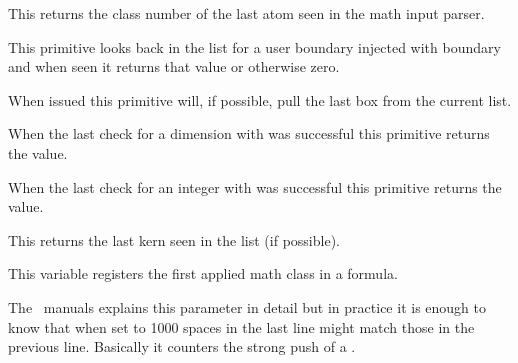 {\getbuffer}

\stopnewprimitive

\startnewprimitive[title={\prm {lastatomclass}}]

This returns the class number of the last atom seen in the math input parser.

\stopnewprimitive

\startnewprimitive[title={\prm {lastboundary}}]

This primitive looks back in the list for a user boundary injected with \prm
{boundary} and when seen it returns that value or otherwise zero.

\stopnewprimitive

\startoldprimitive[title={\prm {lastbox}}]

When issued this primitive will, if possible, pull the last box from the current
list.

\stopoldprimitive

\startnewprimitive[title={\prm {lastchkdimension}}]

When the last check for a dimension with  was successful
this primitive returns the value.

\stopnewprimitive

\startnewprimitive[title={\prm {lastchknumber}}]

When the last check for an integer with  was successful this
primitive returns the value.

\stopnewprimitive

\startoldprimitive[title={\prm {lastkern}}]

This returns the last kern seen in the list (if possible).

\stopoldprimitive

\startnewprimitive[title={\prm {lastleftclass}}]

This variable registers the first applied math class in a formula.

\stopnewprimitive

\startoldprimitive[title={\prm {lastlinefit}}]

The \ETEX\ manuals explains this parameter in detail but in practice it is enough
to know that when set to 1000 spaces in the last line might match those in the
previous line. Basically it counters the strong push of a .

\stopoldprimitive

\startnewprimitive[title={\prm {lastloopiterator}}]

